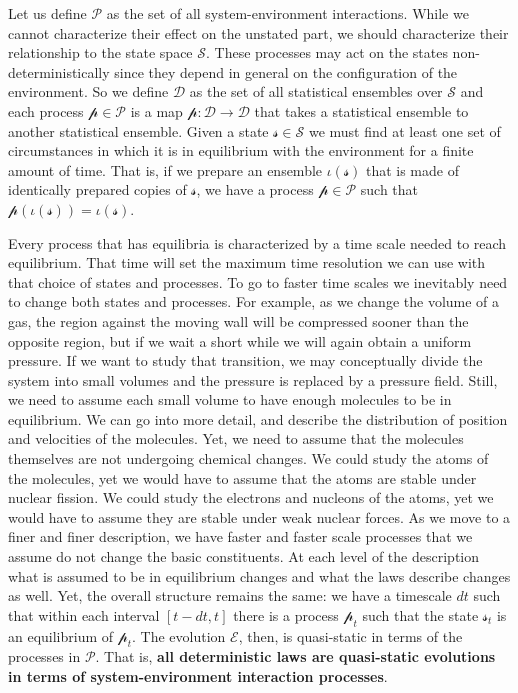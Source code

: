 \documentclass[11pt]{article}
\begin{document}
Let us define $\mathcal{P}$ as the set of all system-environment interactions. While we cannot characterize their effect on the unstated part, we should characterize their relationship to the state space $\mathcal{S}$. These processes may act on the states non-deterministically since they depend in general on the configuration of the environment. So we define $\mathcal{D}$ as the set of all statistical ensembles over $\mathcal{S}$ and each process $\mathcal{p} \in \mathcal{P}$ is a map $\mathcal{p} : \mathcal{D} \to \mathcal{D}$ that takes a statistical ensemble to another statistical ensemble. Given a state $\mathcal{s} \in \mathcal{S}$ we must find at least one set of circumstances in which it is in equilibrium with the environment for a finite amount of time. That is, if we prepare an ensemble $\iota(\mathcal{s})$ that is made of identically prepared copies of $\mathcal{s}$, we have a process $\mathcal{p} \in \mathcal{P}$ such that $\mathcal{p}(\iota(\mathcal{s})) = \iota(\mathcal{s})$.

Every process that has equilibria is characterized by a time scale needed to reach equilibrium. That time will set the maximum time resolution we can use with that choice of states and processes. To go to faster time scales we inevitably need to change both states and processes. For example, as we change the volume of a gas, the region against the moving wall will be compressed sooner than the opposite region, but if we wait a short while we will again obtain a uniform pressure. If we want to study that transition, we may conceptually divide the system into small volumes and the pressure is replaced by a pressure field. Still, we need to assume each small volume to have enough molecules to be in equilibrium. We can go into more detail, and describe the distribution of position and velocities of the molecules. Yet, we need to assume that the molecules themselves are not undergoing chemical changes. We could study the atoms of the molecules, yet we would have to assume that the atoms are stable under nuclear fission. We could study the electrons and nucleons of the atoms, yet we would have to assume they are stable under weak nuclear forces. As we move to a finer and finer description, we have faster and faster scale processes that we assume do not change the basic constituents. At each level of the description what is assumed to be in equilibrium changes and what the laws describe changes as well. Yet, the overall structure remains the same: we have a timescale $dt$ such that within each interval $[t-dt, t]$ there is a process $\mathcal{p}_t$ such that the state $\mathcal{s}_t$ is an equilibrium of $\mathcal{p}_t$. The evolution $\mathcal{E}$, then, is quasi-static in terms of the processes in $\mathcal{P}$. That is, \textbf{all deterministic laws are quasi-static evolutions in terms of system-environment interaction processes}.
\end{document}

